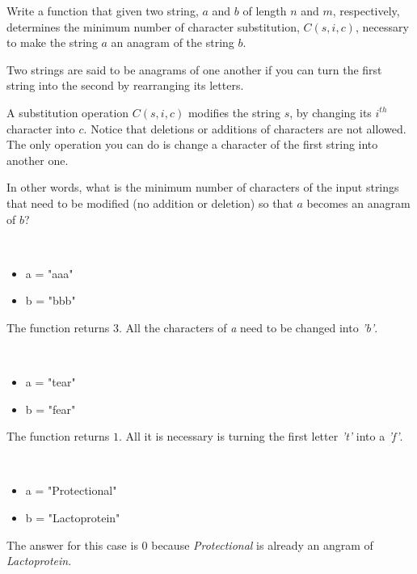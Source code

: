 	\begin{exercise}
		Write a function that given two string, $a$ and $b$ of length $n$ and $m$, respectively, determines the minimum number of character substitution, $C(s, i, c)$, necessary to make the string $a$ an anagram of the string $b$.

		Two strings are said to be anagrams of one another if you can turn the first string into the second by rearranging its letters. 
		
		A substitution operation $C(s,i,c)$ modifies the string $s$, by changing its $i^{th}$ character into $c$. Notice that deletions or additions of characters are not allowed.
		The only operation you can do is change a character of the first string into another one. 
		
		In other words, what is the minimum number of characters of the input strings that need to be modified (no addition or deletion)  so that $a$ becomes an anagram of $b$?
		
	\begin{example}
		\hfill \\
		\begin{itemize}
			\item 	a = "aaa"
			\item 	b = "bbb"
		\end{itemize}
		The function returns $3$. 
		All the characters of \textit{a} need to be changed into \textit{'b'}.
		\label{ex:anagrams:example1}
	\end{example}

	\begin{example}
		\hfill \\
		\begin{itemize}
			\item 	a = "tear"
			\item	b = "fear"
		\end{itemize}
		The function returns $1$. 
		All it is necessary is turning the first letter \textit{'t'} into a \textit{'f'}.
	\end{example}

	\begin{example}
		\hfill \\
		\begin{itemize}
			\item[] 	a = "Protectional"
			\item[] 	b = "Lactoprotein"
		\end{itemize}
		The answer for this case is $0$ because \emph{Protectional} is already an angram of \emph{Lactoprotein}.
	\end{example}
\end{exercise}

